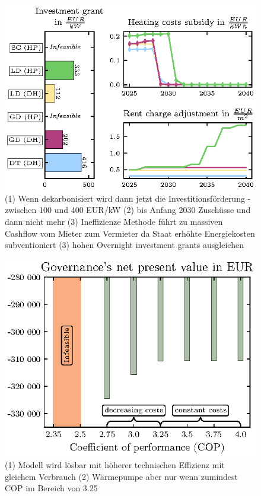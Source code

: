 \begin{figure}[h]
	\centering
	\includegraphics[width=1\linewidth]{figures/4_Results/fig_rent_subsidy_development/price_dev.eps}
	\caption{(1) Wenn dekarbonisiert wird dann jetzt die Investitionsförderung - zwischen 100 und 400 EUR/kW (2) bis Anfang 2030 Zuschüsse und dann nicht mehr (3) Ineffizienze Methode führt zu massiven Cashflow vom Mieter zum Vermieter da Staat erhöhte Energiekosten subventioniert (3) hohen Overnight investment grants ausgleichen}
	\label{fig:sub_rent_dev}
\end{figure}

\begin{figure}[h]
	\centering
	\includegraphics[width=0.75\linewidth]{figures/4_Results/fig_cop_sensitivity/cop_sens_an.eps}
	\caption{(1) Modell wird lösbar mit höherer technischen Effizienz mit gleichem Verbrauch (2) Wärmepumpe aber nur wenn zumindest COP im Bereich von 3.25}
	\label{fig:cop_comparison}
\end{figure}

